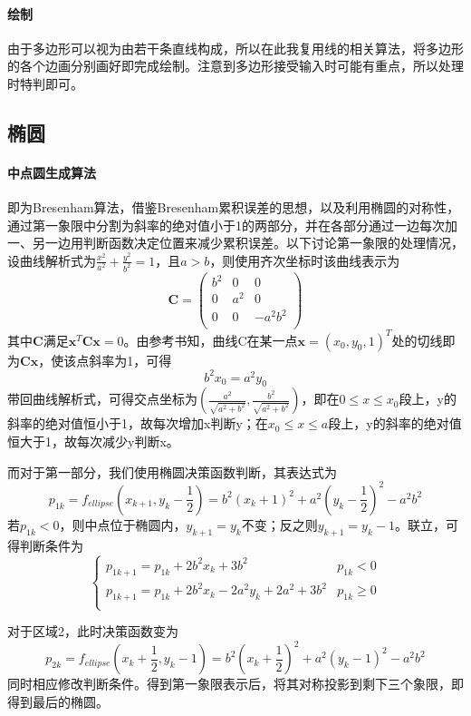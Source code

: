 \documentclass[a4paper,UTF8]{article}
\theoremstyle{definition}
\begin{document}
\paragraph{绘制} 由于多边形可以视为由若干条直线构成，所以在此我复用线的相关算法，将多边形的各个边画分别画好即完成绘制。注意到多边形接受输入时可能有重点，所以处理时特判即可。
\subsection{椭圆}
\paragraph{中点圆生成算法} 即为Bresenham算法，借鉴Bresenham累积误差的思想，以及利用椭圆的对称性，通过第一象限中分割为斜率的绝对值小于1的两部分，并在各部分通过一边每次加一、另一边用判断函数决定位置来减少累积误差。以下讨论第一象限的处理情况，设曲线解析式为$\frac{x^2}{a^2}+\frac{y^2}{b^2}=1$，且$a>b$，则使用齐次坐标时该曲线表示为\cite{homographyBook}
\begin{equation}
\mathbf{C}=\left(
\begin{array}{ccc}
b^2 & 0 & 0 \\
0 & a^2 & 0 \\
0 & 0 & -a^2b^2 \\
\end{array}
\right)
\end{equation}
其中$\mathbf{C}$满足$\mathbf{x}^T\mathbf{C}\mathbf{x}=0$。由参考书知，曲线C在某一点$\mathbf{x}=(x_0,y_0,1)^T$处的切线即为$\mathbf{Cx}$，使该点斜率为1，可得
\begin{equation}
b^2x_0=a^2y_0
\end{equation}
带回曲线解析式，可得交点坐标为$(\frac{a^2}{\sqrt{a^2+b^2}},\frac{b^2}{\sqrt{a^2+b^2}})$，即在$0\leq x\leq x_0$段上，y的斜率的绝对值恒小于1，故每次增加x判断y；在$x_0\leq x\leq a$段上，y的斜率的绝对值恒大于1，故每次减少y判断x。
\par 而对于第一部分，我们使用椭圆决策函数判断，其表达式为\cite{graphTextBook}
\begin{equation}
p_{1k}=f_{ellipse}(x_{k+1},y_k-\frac{1}{2})=b^2(x_k+1)^2+a^2(y_k-\frac{1}{2})^2-a^2b^2
\end{equation}
若$p_{1k}<0$，则中点位于椭圆内，$y_{k+1}=y_{k}$不变；反之则$y_{k+1}=y_k-1$。联立，可得判断条件为
\begin{equation}
\left\{
\begin{array}{ll}
p_{1k+1}=p_{1k}+2b^2x_k+3b^2 & p_{1k}<0 \\
p_{1k+1}=p_{1k}+2b^2x_k-2a^2y_k+2a^2+3b^2 & p_{1k}\geq 0 \\
\end{array}
\right.
\end{equation}
\par 对于区域2，此时决策函数变为
\begin{equation}
p_{2k}=f_{ellipse}(x_{k}+\frac{1}{2},y_k-1)=b^2(x_k+\frac{1}{2})^2+a^2(y_k-1)^2-a^2b^2
\end{equation}
同时相应修改判断条件。得到第一象限表示后，将其对称投影到剩下三个象限，即得到最后的椭圆。
\end{document}
